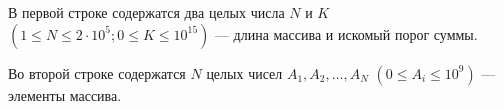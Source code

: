 В первой строке содержатся два целых числа $N$ и $K$ $(1 \le N \le 2 \cdot 10^5; 0 \le K \le 10^{15})$ --- длина массива и искомый порог суммы.

Во второй строке содержатся $N$ целых чисел $A_1, A_2, \ldots, A_N$ $(0 \le A_i \le 10^9)$ --- элементы массива.